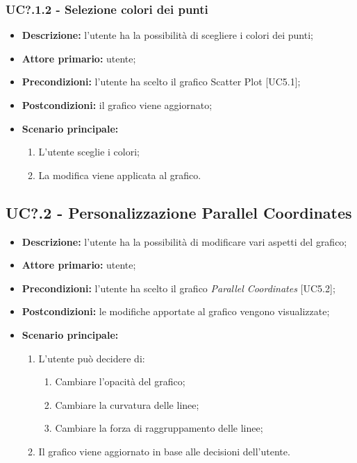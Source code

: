   \subsubsection{UC?.1.2 - Selezione colori dei punti}
  \begin{itemize}
    \item \textbf{Descrizione:} l'utente ha la possibilità di scegliere i colori dei punti;
    \item \textbf{Attore primario:} utente;
    \item \textbf{Precondizioni:} l’utente ha scelto il grafico Scatter Plot [UC5.1];
    \item \textbf{Postcondizioni:} il grafico viene aggiornato;
    \item \textbf{Scenario principale:}
      \begin{enumerate}
      \item L'utente sceglie i colori;
      \item La modifica viene applicata al grafico.
    \end{enumerate}
  \end{itemize}

\subsection{UC?.2 - Personalizzazione Parallel Coordinates}
\begin{itemize}
    \item \textbf{Descrizione:} l'utente ha la possibilità di modificare vari aspetti del grafico;
    \item \textbf{Attore primario:} utente;
    \item \textbf{Precondizioni:} l’utente ha scelto il grafico \textit{Parallel Coordinates} [UC5.2];
    \item \textbf{Postcondizioni:} le modifiche apportate al grafico vengono visualizzate;
    \item \textbf{Scenario principale:}
    \begin{enumerate}
      \item L'utente può decidere di:
    \begin{enumerate}
      \item Cambiare l'opacità del grafico;
      \item Cambiare la curvatura delle linee;
      \item Cambiare la forza di raggruppamento delle linee;
    \end{enumerate}
    \item Il grafico viene aggiornato in base alle decisioni dell'utente.
  \end{enumerate}
  \end{itemize}


